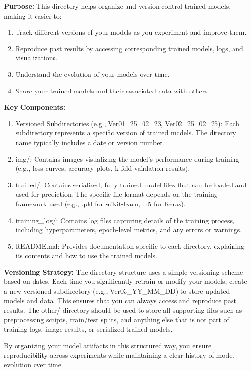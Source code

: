\textbf{Purpose:}
This directory helps organize and version control trained models, making it easier to:
\begin{enumerate}
    \item Track different versions of your models as you experiment and improve them.
    \item Reproduce past results by accessing corresponding trained models, logs, and visualizations.
    \item Understand the evolution of your models over time.
    \item Share your trained models and their associated data with others.
\end{enumerate}

\textbf{Key Components:}
\begin{enumerate}
    \item Versioned Subdirectories (e.g., Ver01\_25\_02\_23, Ver02\_25\_02\_25): Each subdirectory represents a specific version of trained models. The directory name typically includes a date or version number.
    \item img/: Contains images visualizing the model's performance during training (e.g., loss curves, accuracy plots, k-fold validation results).
    \item trained/: Contains serialized, fully trained model files that can be loaded and used for prediction. The specific file format depends on the training framework used (e.g., .pkl for scikit-learn, .h5 for Keras).
    \item training\_log/: Contains log files capturing details of the training process, including hyperparameters, epoch-level metrics, and any errors or warnings.
    \item README.md: Provides documentation specific to each directory, explaining its contents and how to use the trained models.
\end{enumerate}

\textbf{Versioning Strategy:}
The directory structure uses a simple versioning scheme based on dates. Each time you significantly retrain or modify your models, create a new versioned subdirectory (e.g., Ver03\_YY\_MM\_DD) to store updated models and data. This ensures that you can always access and reproduce past results. The other/ directory should be used to store all supporting files such as preprocessing scripts, train/test splits, and anything else that is not part of training logs, image results, or serialized trained models.

By organizing your model artifacts in this structured way, you ensure reproducibility across experiments while maintaining a clear history of model evolution over time.

